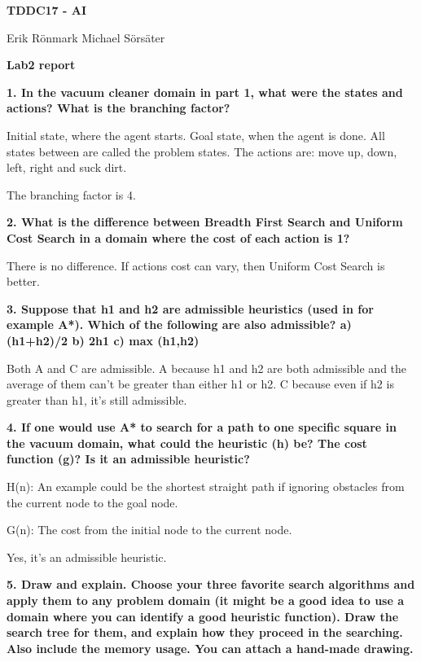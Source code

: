 \documentclass[12pt,a4paper]{article}
\begin{document}
\begin{center}
    \Huge
    \textbf{TDDC17 - AI}

    \vspace{0.3cm}
    \Large
    Erik Rönmark
    Michael Sörsäter
    
    \vspace{0.7cm}
    \textbf{Lab2 report}
\end{center}

\textbf{1. In the vacuum cleaner domain in part 1, what were the states and actions? What is the branching factor?}

Initial state, where the agent starts. Goal state, when the agent is done. All states between are called the problem states. The actions are: move up, down, left, right and suck dirt.

The branching factor is 4.


\textbf{2. What is the difference between Breadth First Search and Uniform Cost Search in a domain where the cost of each action is 1?}

There is no difference. If actions cost can vary, then Uniform Cost Search is better.


\textbf{3. Suppose that h1 and h2 are admissible heuristics (used in for example A*). Which of the following are also admissible?
a) (h1+h2)/2
b) 2h1
c) max (h1,h2)}

Both A and C are admissible. A because h1 and h2 are both admissible and the average of them can't be greater than either h1 or h2. C because even if h2 is greater than h1, it's still admissible. 

\textbf{4. If one would use A* to search for a path to one specific square in the vacuum domain, what could the heuristic (h) be? The cost function (g)? Is it an admissible heuristic?}

H(n): An example could be the shortest straight path if ignoring obstacles from the current node to the goal node.

G(n): The cost from the initial node to the current node.

Yes, it's an admissible heuristic.

\newpage

\textbf{5. Draw and explain. Choose your three favorite search algorithms and apply them to any problem domain (it might be a good idea to use a domain where you can identify a good heuristic function). Draw the search tree for them, and explain how they proceed in the searching. Also include the memory usage. You can attach a hand-made drawing.}
\end{document}
